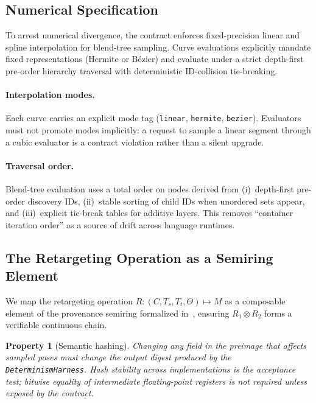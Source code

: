 \documentclass[sigconf,nonacm]{acmart}
\newcommand{\tropmult}{\otimes}
\newtheorem{property}{Property}
\begin{document}
\subsection{Numerical Specification}
To arrest numerical divergence, the contract enforces fixed-precision linear and spline interpolation for blend-tree sampling. Curve evaluations explicitly mandate fixed representations (Hermite or B\'ezier) and evaluate under a strict depth-first pre-order hierarchy traversal with deterministic ID-collision tie-breaking. %

\paragraph{Interpolation modes.}
Each curve carries an explicit mode tag (\texttt{linear}, \texttt{hermite},
\texttt{bezier}). Evaluators must not promote modes implicitly: a request to
sample a linear segment through a cubic evaluator is a contract violation
rather than a silent upgrade.

\paragraph{Traversal order.}
Blend-tree evaluation uses a total order on nodes derived from (i)~depth-first
pre-order discovery IDs, (ii)~stable sorting of child IDs when unordered sets
appear, and (iii)~explicit tie-break tables for additive layers. This removes
``container iteration order'' as a source of drift across language runtimes.

\subsection{The Retargeting Operation as a Semiring Element}
We map the retargeting operation $R: (C, T_s, T_t, \Theta) \mapsto M$ as a composable element of the provenance semiring formalized in~\cite{capstone-uist2027}, ensuring $R_1 \tropmult R_2$ forms a verifiable continuous chain. %

\begin{property}[Semantic hashing]
Changing any field in the preimage that affects sampled poses must change the
output digest produced by the \texttt{DeterminismHarness}. Hash stability across
implementations is the acceptance test; bitwise equality of intermediate
floating-point registers is not required unless exposed by the contract.
\end{property}
\end{document}
